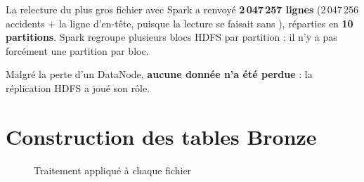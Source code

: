 \documentclass[11pt,a4paper]{report}
\newcommand{\code}[1]{\texttt{\detokenize{#1}}}
\begin{document}
La relecture du plus gros fichier avec Spark a renvoyé \textbf{2\,047\,257 lignes} (2\,047\,256 accidents + la ligne d'en-tête, puisque la lecture se faisait sans \code{header=True}), réparties en \textbf{10 partitions}. Spark regroupe plusieurs blocs HDFS par partition : il n'y a pas forcément une partition par bloc.

\begin{keybox}
Malgré la perte d'un DataNode, \textbf{aucune donnée n'a été perdue} : la réplication HDFS a joué son rôle.
\end{keybox}

\section{Construction des tables Bronze}

\begin{figure}[H]
\centering
{}
\caption{Traitement appliqué à chaque fichier}
\end{figure}
\end{document}
